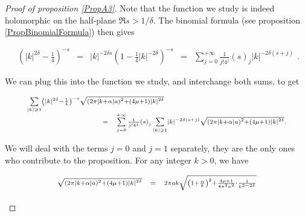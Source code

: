 \documentclass{jams-l}
\theoremstyle{definition}
\theoremstyle{remark}
\numberwithin{equation}{section}
\begin{document}
            \begin{proof}[Proof of proposition \ref{PropA3}]
            
                Note that the function we study is indeed holomorphic on the half-plane $\Re s > 1/\delta$. The binomial formula (see proposition \ref{PropBinomialFormula}) then gives
                
                \[ \begin{array}{lllll}
                        \left( \left \vert k \right \vert^{2 \delta} - \frac{1}{4} \right)^{-s} & = & \left \vert k \right \vert^{-2 \delta s} \left( 1 - \frac{1}{4} \left \vert k \right \vert^{-2\delta} \right)^{-s}  & = & \sum\limits_{j = 0}^{+ \infty} \frac{1}{j! 4^{j}} \left( s \right)_j \left \vert k \right \vert^{-2 \delta \left( s + j \right)}
                    \end{array} . \]
                
                \noindent We can plug this into the function we study, and interchange both sums, to get
                
                \[ \begin{array}{lll}
                        \multicolumn{3}{l}{\scriptstyle \sum\limits_{\left \vert k \right \vert \geqslant 1} \left( \left \vert k \right \vert^{2 \delta} - \frac{1}{4} \right)^{-s} \sqrt{\left( 2 \pi \left \vert k + \alpha \right \vert a \right)^2 + \left( 4 \mu + 1 \right) \left \vert k \right \vert^{2 \delta}}} \\[0.5em] 
                        
                        \qquad \qquad \qquad \qquad & \scriptstyle = & \scriptstyle \sum\limits_{j = 0}^{+ \infty} \frac{1}{j! 4^{j}} \left( s \right)_j \sum\limits_{\left \vert k \right \vert \geqslant 1} \left \vert k \right \vert^{-2 \delta \left( s + j \right)} \sqrt{\left( 2 \pi \left \vert k + \alpha \right \vert a \right)^2 + \left( 4 \mu + 1 \right) \left \vert k \right \vert^{2 \delta}}.
                    \end{array} \]
                
                \noindent We will deal with the terms $j=0$ and $j=1$ separately, they are the only ones who contribute to the proposition. For any integer $k > 0$, we have
                
                \[ \begin{array}{lllll}
                        \multicolumn{3}{l}{\scriptstyle \sqrt{\left( 2 \pi \left \vert k + \alpha \right \vert a \right)^2 + \left( 4 \mu + 1 \right) \left \vert k \right \vert^{2 \delta}}} & \scriptstyle = & \scriptstyle 2 \pi a k \sqrt{ \left( 1 + \frac{\alpha}{k} \right)^2 + \frac{4 \mu + 1}{4 \pi^2 a^2} \cdot \frac{1}{k^{2-2\delta}}} \\[1em]
                        

\end{array}\]
\end{proof}
\end{document}
